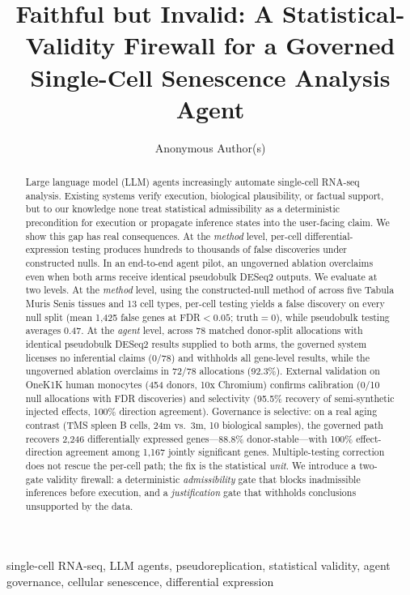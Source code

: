 \documentclass[pmlr,twocolumn,10pt]{jmlr}
\title[Faithful but Invalid]{Faithful but Invalid: A Statistical-Validity
Firewall for a Governed Single-Cell Senescence Analysis Agent}
\author{Anonymous Author(s)}
\begin{document}
\maketitle

\begin{abstract}
Large language model (LLM) agents increasingly automate single-cell RNA-seq
analysis. Existing systems verify execution, biological plausibility, or factual
support, but to our knowledge none treat statistical admissibility as a
deterministic precondition for execution or propagate inference states into the
user-facing claim. We show this gap has real consequences. At the \textit{method} level, per-cell differential-expression
testing produces hundreds to thousands of false discoveries under constructed
nulls. In an end-to-end agent pilot, an ungoverned ablation overclaims even when
both arms receive identical pseudobulk DESeq2 outputs. We evaluate at two levels.
At the \textit{method} level, using the constructed-null method of
\citet{squair2021} across five Tabula Muris Senis tissues and 13 cell types,
per-cell testing yields a false discovery on every null split (mean 1{,}425 false
genes at FDR${<}0.05$; truth${=}0$), while pseudobulk testing averages 0.47. At
the \textit{agent} level, across 78 matched donor-split allocations with
identical pseudobulk DESeq2 results supplied to both arms, the governed system
licenses no inferential claims (0/78) and withholds all gene-level results,
while the ungoverned ablation overclaims in 72/78 allocations (92.3\%).
External validation on OneK1K human monocytes (454 donors, 10x Chromium)
confirms calibration (0/10 null allocations with FDR discoveries) and
selectivity (95.5\% recovery of semi-synthetic injected effects, 100\%
direction agreement). Governance is selective: on a real aging contrast
(TMS spleen B cells, 24m vs.\ 3m, 10 biological samples), the governed
path recovers 2{,}246 differentially expressed genes---88.8\%
donor-stable---with 100\% effect-direction agreement among 1{,}167 jointly
significant genes. Multiple-testing correction does not rescue the per-cell
path; the fix is the statistical \textit{unit}. We introduce
a two-gate validity firewall: a deterministic \textit{admissibility} gate that
blocks inadmissible inferences before execution, and a \textit{justification}
gate that withholds conclusions unsupported by the data.
\end{abstract}

\begin{keywords}
single-cell RNA-seq, LLM agents, pseudoreplication, statistical validity, agent
governance, cellular senescence, differential expression
\end{keywords}
\end{document}
